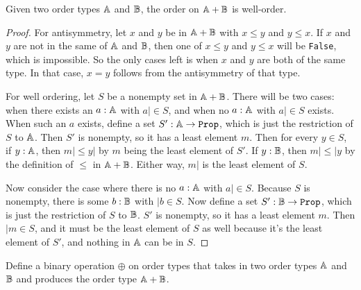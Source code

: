 \documentclass[../../math.tex]{subfiles}
\begin{document}
\begin{lemma}
    Given two order types $\mathbb{A}$ and $\mathbb{B}$, the order on $\mathbb{A} + \mathbb{B}$ is well-order.
\end{lemma}
\begin{proof}
    For antisymmetry, let $x$ and $y$ be in $\mathbb{A} + \mathbb{B}$ with $x \leq y$ and $y
    \leq x$.  If $x$ and $y$ are not in the same of $\mathbb{A}$ and $\mathbb{B}$, then one of
    $x \leq y$ and $y \leq x$ will be \verb|False|, which is impossible.  So the
    only cases left is when $x$ and $y$ are both of the same type.  In that
    case, $x = y$ follows from the antisymmetry of that type.

    For well ordering, let $S$ be a nonempty set in $\mathbb{A} + \mathbb{B}$.  There will be
    two cases: when there exists an $a : \mathbb{A}$ with $a| \in S$, and when no $a :
    \mathbb{A}$ with $a| \in S$ exists.  When such an $a$ exists, define a set $S' : \A
    \to \Prop$, which is just the restriction of $S$ to $\mathbb{A}$.  Then $S'$ is
    nonempty, so it has a least element $m$.  Then for every $y \in S$, if $y :
    \mathbb{A}$, then $m| \leq y|$ by $m$ being the least element of $S'$.  If $y : \mathbb{B}$,
    then $m| \leq |y$ by the definition of $\leq$ in $\mathbb{A} + \mathbb{B}$.  Either way,
    $m|$ is the least element of $S$.

    Now consider the case where there is no $a : \mathbb{A}$ with $a| \in S$.  Because
    $S$ is nonempty, there is some $b : \mathbb{B}$ with $|b \in S$.  Now define a set
    $S' : \B \to \Prop$, which is just the restriction of $S$ to $\mathbb{B}$.  $S'$ is
    nonempty, so it has a least element $m$.  Then $|m \in S$, and it must be
    the least element of $S$ as well because it's the least element of $S'$, and
    nothing in $\mathbb{A}$ can be in $S$.
\end{proof}

\begin{definition}
    Define a binary operation $\oplus$ on order types that takes in two order
    types $\mathbb{A}$ and $\mathbb{B}$ and produces the order type $\mathbb{A} + \mathbb{B}$.
\end{definition}
\end{document}
